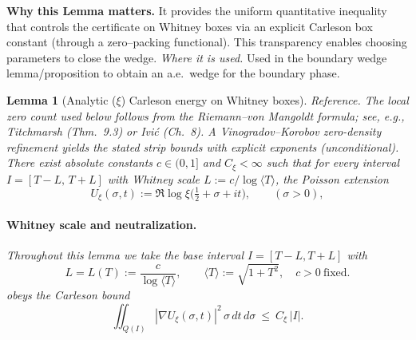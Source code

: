 \documentclass[11pt]{article}
\newtheorem{lemma}{Lemma}[section]
\theoremstyle{definition}
\theoremstyle{remark}
\begin{document}
\vspace{1.0cm}
\noindent\textbf{Why this Lemma matters.} It provides the uniform quantitative inequality that controls the certificate on Whitney boxes via an explicit Carleson box constant (through a zero--packing functional). This transparency enables choosing parameters to close the wedge.
\noindent\textit{Where it is used.} Used in the boundary wedge lemma/proposition to obtain an a.e.\ wedge for the boundary phase.
\begin{lemma}[Analytic ($\xi$) Carleson energy on Whitney boxes]
\label{lem:carleson-xi}
\emph{Reference.} The local zero count used below follows from the Riemann–von Mangoldt formula; see, e.g., Titchmarsh (Thm.~9.3) or Ivi\'c (Ch.~8). A Vinogradov–Korobov zero-density refinement yields the stated strip bounds with explicit exponents (unconditional).
There exist absolute constants $c\in(0,1]$ and $C_\xi<\infty$ such that for every interval $I=[T-L,\,T+L]$ with Whitney scale $L:=c/\log\langle T\rangle$, the Poisson extension
\[
 U_{\xi}(\sigma,t):=\Re\log\xi\big(\tfrac12+\sigma+it\big),\qquad (\sigma>0),
\]













\vspace{1.0cm}
\paragraph{Whitney scale and neutralization.}

Throughout this lemma we take the base interval $I=[T-L,T+L]$ with
\[
  L=L(T):=\frac{c}{\log\langle T\rangle},\qquad \langle T\rangle:=\sqrt{1+T^2},\quad c>0\ \text{fixed}.
\]
obeys the Carleson bound
\[ \iint_{Q(I)} |\nabla U_{\xi}(\sigma,t)|^2\,\sigma\,dt\,d\sigma\ \le\ C_\xi\,|I|. \]
\end{lemma}
\end{document}
